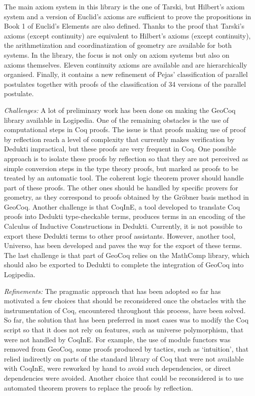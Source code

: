 The main axiom system in this library is the one of Tarski, but
Hilbert's axiom system and a version of Euclid's axioms are sufficient to
prove the propositions in Book 1 of Euclid's Elements are also
defined. Thanks to the proof that Tarski's axioms (except continuity)
are equivalent to Hilbert's axioms (except continuity), the
arithmetization and coordinatization of geometry are available for
both systems. In the library, the focus is not only on axiom systems
but also on axioms themselves. Eleven continuity axioms are available
and are hierarchically organised. Finally, it contains a new
refinement of Pejas' classification of parallel postulates together
with proofs of the classification of 34 versions of the parallel
postulate.

\emph{Challenges:} A lot of preliminary work has been done on making the
GeoCoq library available in Logipedia.  One of the remaining obstacles is the use of
computational steps in Coq proofs. The issue is that proofs making use of
proof by reflection reach a level of complexity that currently makes
verification by Dedukti impractical, but these proofs are very
frequent in Coq.  One possible approach is to isolate these proofs by
reflection so that they are not perceived as simple conversion steps
in the type theory proofs, but marked as proofs to be treated by an
automatic tool. The coherent logic theorem prover should handle part
of these proofs. The other ones should be handled by specific provers
for geometry, as they correspond to proofs obtained by the Gr\"obner
basis method in GeoCoq.  Another challenge is that CoqInE, a tool
developed to translate Coq proofs into Dedukti type-checkable terms,
produces terms in an encoding of the Calculus of Inductive
Constructions in Dedukti. Currently, it is not possible to export these
Dedukti terms to other proof assistants. However, another tool,
Universo, has been developed and paves the way for the export of these
terms.  The last challenge is that part of GeoCoq relies on the
MathComp library, which should also be exported to Dedukti to complete
the integration of GeoCoq into Logipedia.

\emph{Refinements:} The pragmatic approach that has been adopted so
far has motivated a few choices that should be reconsidered once the
obstacles with the instrumentation of Coq, encountered throughout this
process, have been solved. So far, the solution that has been
preferred in most cases was to modify the Coq script so that it does
not rely on features, such as universe polymorphism, that were not
handled by CoqInE. For example, the use of module functors was removed
from GeoCoq, some proofs produced by tactics, such as `intuition',
that relied indirectly on parts of the standard library of Coq that
were not available with CoqInE, were reworked by hand to avoid such
dependencies, or direct dependencies were avoided. Another choice that
could be reconsidered is to use automated theorem provers to replace
the proofs by reflection.

